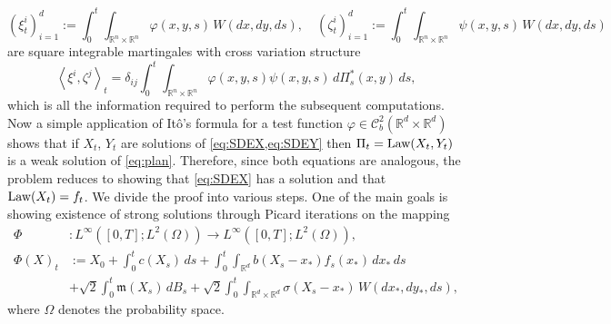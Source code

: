 \documentclass[10pt,oneside]{amsart}
\numberwithin{equation}{section}
\numberwithin{definition}{section}
\numberwithin{theorem}{section}
\numberwithin{lemma}{section}
\begin{document}
%
\begin{equation*}
  (\xi_{t}^{i})_{i=1}^{d}:=\int_{0}^{t}\int_{\mathbb{R}^{n}\times\mathbb{R}^{n}}\varphi(x,y,s)\,W(dx,dy,ds),\quad
  (\zeta_{t}^{i})_{i=1}^{d}:=\int_{0}^{t}\int_{\mathbb{R}^{n}\times\mathbb{R}^{n}}\psi(x,y,s)\,W(dx,dy,ds)
\end{equation*}
% 
are square integrable martingales with cross variation structure 
%
\begin{equation*}
  \left\langle \xi^{i},\zeta^{j}\right\rangle _{t}=\delta_{ij}\int_{0}^{t}\int_{\mathbb{R}^{n}\times\mathbb{R}^{n}}\varphi(x,y,s)\psi(x,y,s)\,d\Pi_{s}^{*}(x,y)\,ds,
\end{equation*}
%
which is all the information required to perform the subsequent computations. Now a simple application of Itô's formula for a test function $\varphi\in \mathcal C^2_b(\mathbb R^d\times \mathbb R^d)$ shows that if $X_t$, $Y_t$ are solutions of \cref{eq:SDEX,eq:SDEY} then $\Pi_t=\textnormal{Law}(X_t,Y_t)$ is a weak solution of \cref{eq:plan}. Therefore, since both equations are analogous, the problem reduces to showing that \cref{eq:SDEX} has a solution and that $\textnormal{Law}(X_t)=f_t$. We divide the proof into various steps. One of the main goals is showing existence of strong solutions through Picard iterations on the mapping
%
\begin{align*}
  \Phi&:L^{\infty}\left([0,T];L^{2}(\Omega)\right)\longrightarrow L^{\infty}\left([0,T];L^{2}(\Omega)\right),\\
  \Phi(X)_{t}&
  :=X_{0}+\int_{0}^{t}c(X_{s})\,ds
  +\int_{0}^{t}\int_{\mathbb{R}^{d}}b(X_{s}-x_{*})f_{s}(x_{*})\,dx_{*}\,ds\\
  &+\sqrt 2\int_{0}^{t}\mathfrak m(X_{s})\,dB_s+\sqrt 2\int_{0}^{t}\int_{\mathbb{R}^{d}\times\mathbb{R}^{d}}\sigma(X_{s}-x_{*})\,W(dx_{*},dy_{*},ds),
\end{align*}
%
where $\Omega$ denotes the probability space.
\end{document}
